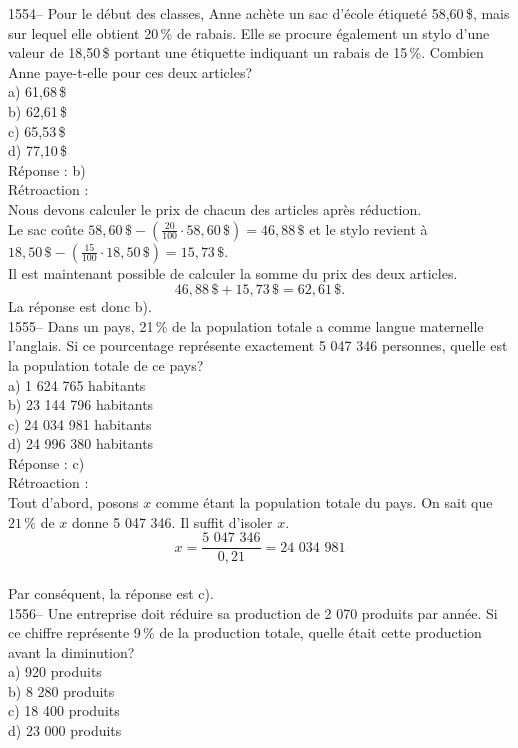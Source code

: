 1554-- Pour le d\'ebut des classes, Anne ach\`ete un sac d'\'ecole
\'etiquet\'e 58,60\,\$, mais sur lequel elle obtient 20\,\% de
rabais. Elle se procure \'egalement un stylo d'une valeur de
18,50\,\$ portant une \'etiquette indiquant un rabais de 15\,\%.
Combien Anne paye-t-elle pour ces deux articles?\\
a) 61,68\,\$\\
b) 62,61\,\$\\
c) 65,53\,\$\\
d) 77,10\,\$\\

R\'eponse : b)\\

R\'etroaction :\\
Nous devons calculer le prix de chacun des articles apr\`es
r\'eduction.\\

Le sac co\^ute $58,60\,\$-(\frac{20}{100}\cdot58,60\,\$)=46,88\,\$$
et le stylo revient \`a
$18,50\,\$-(\frac{15}{100}\cdot18,50\,\$)=15,73\,\$$.\\ Il est
maintenant possible de calculer la somme du prix des deux articles.
\\$$46,88\,\$+15,73\,\$=62,61\,\$.$$ La r\'eponse est donc b).\\

1555-- Dans un pays, 21\,\% de la population totale a comme langue
maternelle l'anglais. Si ce pourcentage repr\'esente exactement 5
047 346 personnes,
quelle est la population totale de ce pays?\\
a) 1 624 765 habitants\\
b) 23 144 796 habitants\\
c) 24 034 981 habitants\\
d) 24 996 380 habitants\\

R\'eponse : c)\\

R\'etroaction :\\
Tout d'abord, posons $x$ comme \'etant la population totale du pays.
On sait que $21\,\%$ de $x$ donne {\textrm{5 047 346}}. Il suffit
d'isoler $x$. \\$$x=\frac{\textrm{5 047 346}}{0,21}={\textrm{24 034
981}}$$\\
Par cons\'equent, la r\'eponse est c).\\

1556-- Une entreprise doit r\'eduire sa production de 2 070  produits
par ann\'ee. Si ce chiffre repr\'esente 9\,\% de la production
totale, quelle
\'etait cette production avant la diminution?\\
a) 920 produits\\
b) 8 280 produits \\
c) 18 400 produits\\
d) 23 000 produits\\

